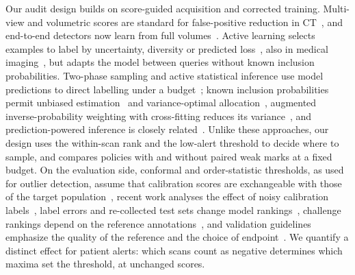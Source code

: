 Our audit design builds on score-guided acquisition and corrected training. Multi-view and volumetric scores are standard for false-positive reduction in CT~\cite{setio2016views,dou2017multilevel,setio2017}, and end-to-end detectors now learn from full volumes~\cite{ardila2019endtoend,baumgartner2021nndetection}. Active learning selects examples to label by uncertainty, diversity or predicted loss~\cite{settles2009,sener2018coreset,yoo2019learningloss,yuan2021miaod}, also in medical imaging~\cite{budd2021survey,liu2020active}, but adapts the model between queries without known inclusion probabilities. Two-phase sampling and active statistical inference use model predictions to direct labelling under a budget~\cite{chen2020sampling,zrnic2024active,li2025robust}; known inclusion probabilities permit unbiased estimation~\cite{horvitz1952} and variance-optimal allocation~\cite{neyman1934}, augmented inverse-probability weighting with cross-fitting reduces its variance~\cite{robins1994,chernozhukov2018}, and prediction-powered inference is closely related~\cite{angelopoulos2023ppi,ppssl2025}. Unlike these approaches, our design uses the within-scan rank and the low-alert threshold to decide where to sample, and compares policies with and without paired weak marks at a fixed budget. On the evaluation side, conformal and order-statistic thresholds, as used for outlier detection, assume that calibration scores are exchangeable with those of the target population~\cite{vovk2005,angelopoulos2023conformal,bates2023outliers}, recent work analyses the effect of noisy calibration labels~\cite{einbinder2024label,feldman2026corrupted}, label errors and re-collected test sets change model rankings~\cite{northcutt2021labelerrors,recht2019imagenet,beyer2020imagenet}, challenge rankings depend on the reference annotations~\cite{maierhein2018rankings}, and validation guidelines emphasize the quality of the reference and the choice of endpoint~\cite{maierhein2024metrics}. We quantify a distinct effect for patient alerts: which scans count as negative determines which maxima set the threshold, at unchanged scores.
